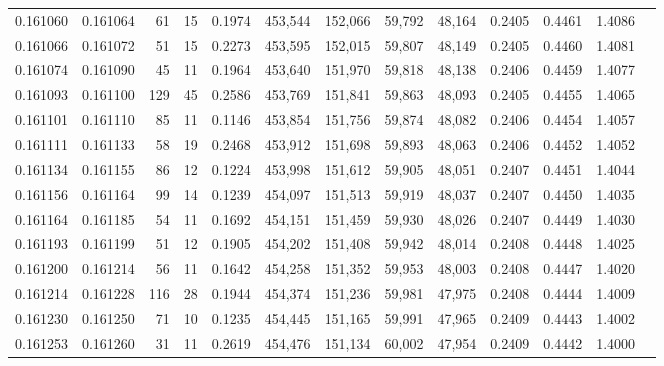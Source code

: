 \begin{tabular}{rrrrrrrrrrrrr}
0.161060 & 0.161064 &    61 &  15 &                                     0.1974 & 453,544 & 152,066 &  59,792 &  48,164 & 0.2405 & 0.4461 & 1.4086 \\
0.161066 & 0.161072 &    51 &  15 &                                     0.2273 & 453,595 & 152,015 &  59,807 &  48,149 & 0.2405 & 0.4460 & 1.4081 \\
0.161074 & 0.161090 &    45 &  11 &                                     0.1964 & 453,640 & 151,970 &  59,818 &  48,138 & 0.2406 & 0.4459 & 1.4077 \\
0.161093 & 0.161100 &   129 &  45 &                                     0.2586 & 453,769 & 151,841 &  59,863 &  48,093 & 0.2405 & 0.4455 & 1.4065 \\
0.161101 & 0.161110 &    85 &  11 &                                     0.1146 & 453,854 & 151,756 &  59,874 &  48,082 & 0.2406 & 0.4454 & 1.4057 \\
0.161111 & 0.161133 &    58 &  19 &                                     0.2468 & 453,912 & 151,698 &  59,893 &  48,063 & 0.2406 & 0.4452 & 1.4052 \\
0.161134 & 0.161155 &    86 &  12 &                                     0.1224 & 453,998 & 151,612 &  59,905 &  48,051 & 0.2407 & 0.4451 & 1.4044 \\
0.161156 & 0.161164 &    99 &  14 &                                     0.1239 & 454,097 & 151,513 &  59,919 &  48,037 & 0.2407 & 0.4450 & 1.4035 \\
0.161164 & 0.161185 &    54 &  11 &                                     0.1692 & 454,151 & 151,459 &  59,930 &  48,026 & 0.2407 & 0.4449 & 1.4030 \\
0.161193 & 0.161199 &    51 &  12 &                                     0.1905 & 454,202 & 151,408 &  59,942 &  48,014 & 0.2408 & 0.4448 & 1.4025 \\
0.161200 & 0.161214 &    56 &  11 &                                     0.1642 & 454,258 & 151,352 &  59,953 &  48,003 & 0.2408 & 0.4447 & 1.4020 \\
0.161214 & 0.161228 &   116 &  28 &                                     0.1944 & 454,374 & 151,236 &  59,981 &  47,975 & 0.2408 & 0.4444 & 1.4009 \\
0.161230 & 0.161250 &    71 &  10 &                                     0.1235 & 454,445 & 151,165 &  59,991 &  47,965 & 0.2409 & 0.4443 & 1.4002 \\
0.161253 & 0.161260 &    31 &  11 &                                     0.2619 & 454,476 & 151,134 &  60,002 &  47,954 & 0.2409 & 0.4442 & 1.4000 \\

\end{tabular}
